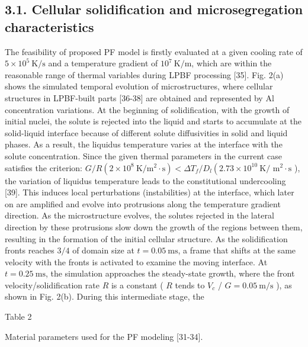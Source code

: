 \documentclass[10pt]{article}
\begin{document}
\subsection*{3.1. Cellular solidification and microsegregation characteristics}
The feasibility of proposed PF model is firstly evaluated at a given cooling rate of $5 \times 10^{5} \mathrm{~K} / \mathrm{s}$ and a temperature gradient of $10^{7} \mathrm{~K} / \mathrm{m}$, which are within the reasonable range of thermal variables during LPBF processing [35]. Fig. 2(a) shows the simulated temporal evolution of microstructures, where cellular structures in LPBF-built parts [36-38] are obtained and represented by $\mathrm{Al}$ concentration variations. At the beginning of solidification, with the growth of initial nuclei, the solute is rejected into the liquid and starts to accumulate at the solid-liquid interface because of different solute diffusivities in solid and liquid phases. As a result, the liquidus temperature varies at the interface with the solute concentration. Since the given thermal parameters in the current case satisfies the criterion: $G / R\left(2 \times 10^{8} \mathrm{~K} / \mathrm{m}^{2} \cdot \mathrm{s}\right)<\Delta T_{f} / D_{l}\left(2.73 \times 10^{10} \mathrm{~K} /\right.$ $\mathrm{m}^{2} \cdot \mathrm{s}$ ), the variation of liquidus temperature leads to the constitutional undercooling [39]. This induces local perturbations (instabilities) at the interface, which later on are amplified and evolve into protrusions along the temperature gradient direction. As the microstructure evolves, the solutes rejected in the lateral direction by these protrusions slow down the growth of the regions between them, resulting in the formation of the initial cellular structure. As the solidification fronts reaches $3 / 4$ of domain size at $t=0.05 \mathrm{~ms}$, a frame that shifts at the same velocity with the fronts is activated to examine the moving interface. At $t=0.25 \mathrm{~ms}$, the simulation approaches the steady-state growth, where the front velocity/solidification rate $R$ is a constant ( $R$ tends to $V_{c}$ / $G=0.05 \mathrm{~m} / \mathrm{s}$ ), as shown in Fig. 2(b). During this intermediate stage, the

Table 2

Material parameters used for the PF modeling [31-34].
\end{document}
